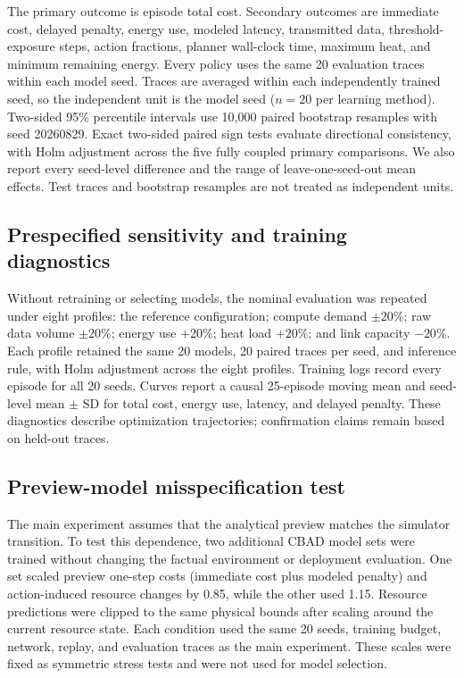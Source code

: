 \documentclass[11pt]{article}
\begin{document}
The primary outcome is episode total cost. Secondary outcomes are immediate cost, delayed penalty, energy use, modeled latency, transmitted data, threshold-exposure steps, action fractions, planner wall-clock time, maximum heat, and minimum remaining energy. Every policy uses the same 20 evaluation traces within each model seed. Traces are averaged within each independently trained seed, so the independent unit is the model seed ($n=20$ per learning method). Two-sided 95\% percentile intervals use 10,000 paired bootstrap resamples with seed 20260829. Exact two-sided paired sign tests evaluate directional consistency, with Holm adjustment across the five fully coupled primary comparisons. We also report every seed-level difference and the range of leave-one-seed-out mean effects. Test traces and bootstrap resamples are not treated as independent units.

\subsection{Prespecified sensitivity and training diagnostics}

Without retraining or selecting models, the nominal evaluation was repeated under eight profiles: the reference configuration; compute demand $\pm20\%$; raw data volume $\pm20\%$; energy use $+20\%$; heat load $+20\%$; and link capacity $-20\%$. Each profile retained the same 20 models, 20 paired traces per seed, and inference rule, with Holm adjustment across the eight profiles. Training logs record every episode for all 20 seeds. Curves report a causal 25-episode moving mean and seed-level mean $\pm$ SD for total cost, energy use, latency, and delayed penalty. These diagnostics describe optimization trajectories; confirmation claims remain based on held-out traces.

\subsection{Preview-model misspecification test}

The main experiment assumes that the analytical preview matches the simulator transition. To test this dependence, two additional CBAD model sets were trained without changing the factual environment or deployment evaluation. One set scaled preview one-step costs (immediate cost plus modeled penalty) and action-induced resource changes by 0.85, while the other used 1.15. Resource predictions were clipped to the same physical bounds after scaling around the current resource state. Each condition used the same 20 seeds, training budget, network, replay, and evaluation traces as the main experiment. These scales were fixed as symmetric stress tests and were not used for model selection.
\end{document}
